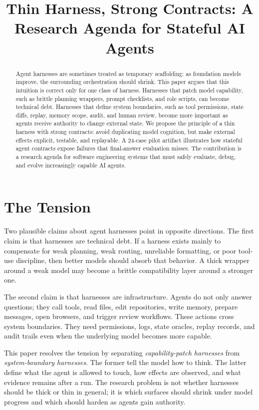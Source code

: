 \documentclass[10pt,conference]{IEEEtran}
\title{Thin Harness, Strong Contracts: A Research Agenda for Stateful AI Agents}
\author{\IEEEauthorblockN{Anonymous Author(s)}}
\begin{document}
\maketitle

\begin{abstract}
Agent harnesses are sometimes treated as temporary scaffolding: as foundation
models improve, the surrounding orchestration should shrink. This paper argues
that this intuition is correct only for one class of harness. Harnesses that
patch model capability, such as brittle planning wrappers, prompt checklists,
and role scripts, can become technical debt. Harnesses that define system
boundaries, such as tool permissions, state diffs, replay, memory scope, audit,
and human review, become more important as agents receive authority to change
external state. We propose the principle of a thin harness with strong
contracts: avoid duplicating model cognition, but make external effects
explicit, testable, and replayable. A 24-case pilot artifact illustrates how
stateful agent contracts expose failures that final-answer evaluation misses.
The contribution is a research agenda for software engineering systems that
must safely evaluate, debug, and evolve increasingly capable AI agents.
\end{abstract}

\section{The Tension}

Two plausible claims about agent harnesses point in opposite directions. The
first claim is that harnesses are technical debt. If a harness exists mainly to
compensate for weak planning, weak routing, unreliable formatting, or poor
tool-use discipline, then better models should absorb that behavior. A thick
wrapper around a weak model may become a brittle compatibility layer around a
stronger one.

The second claim is that harnesses are infrastructure. Agents do not only
answer questions; they call tools, read files, edit repositories, write memory,
prepare messages, open browsers, and trigger review workflows. These actions
cross system boundaries. They need permissions, logs, state oracles, replay
records, and audit trails even when the underlying model becomes more capable.

This paper resolves the tension by separating \emph{capability-patch
harnesses} from \emph{system-boundary harnesses}. The former tell the model how
to think. The latter define what the agent is allowed to touch, how effects are
observed, and what evidence remains after a run. The research problem is not
whether harnesses should be thick or thin in general; it is which surfaces
should shrink under model progress and which should harden as agents gain
authority.
\end{document}
